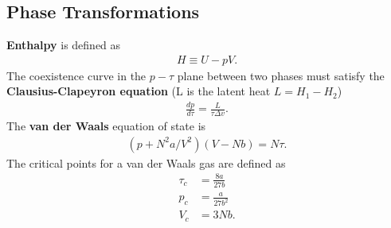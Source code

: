 \begin{multicols}{2}
	\section{Phase Transformations}
	\textbf{Enthalpy} is defined as
	\begin{align}
		H \equiv U - pV.
	\end{align}
	The coexistence curve in the $p-\tau$ plane between two phases must satisfy the \textbf{Clausius-Clapeyron equation} (L is the latent heat $L=H_1-H_2$)
	\begin{align}
		\frac{dp}{d\tau} = \frac{L}{\tau \Delta v}.
	\end{align}
	The \textbf{van der Waals} equation of state is
	\begin{align}
		(p+N^2a/V^2)(V-Nb) = N\tau.
	\end{align}
	The critical points for a van der Waals gas are defined as
	\begin{align}
		\tau_c &= \frac{8a}{27b} \\
		p_c &= \frac{a}{27b^2} \\
		V_c &= 3Nb.
	\end{align}	

\end{multicols}
